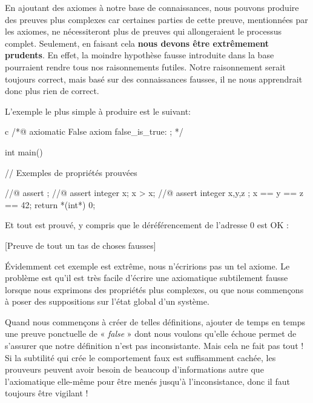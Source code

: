 

En ajoutant des axiomes à notre base de connaissances, nous pouvons produire des
preuves plus complexes car certaines parties de cette preuve, mentionnées par 
les axiomes, ne nécessiteront plus de preuves qui allongeraient le processus 
complet. Seulement, en faisant cela \textbf{nous devons être extrêmement prudents}.
En effet, la moindre hypothèse fausse introduite dans la base pourraient rendre
tous nos raisonnements futiles. Notre raisonnement serait toujours correct, mais
basé sur des connaissances fausses, il ne nous apprendrait donc plus rien de correct.



L'exemple le plus simple à produire est le suivant:



\begin{CodeBlock}{c}
/*@
  axiomatic False{
    axiom false_is_true: \false;
  }
*/

int main(){
  // Exemples de propriétés prouvées

  //@ assert \false;
  //@ assert \forall integer x; x > x;
  //@ assert \forall integer x,y,z ; x == y == z == 42;
  return *(int*) 0;
}
\end{CodeBlock}



Et tout est prouvé, y compris que le déréférencement de l'adresse 0 est OK :



[Preuve de tout un tas de choses fausses]


Évidemment cet exemple est extrême, nous n'écririons pas un tel axiome. Le
problème est qu'il est très facile d'écrire une axiomatique subtilement fausse
lorsque nous exprimons des propriétés plus complexes, ou que nous commençons à
poser des suppositions sur l'état global d'un système.



Quand nous commençons à créer de telles définitions, ajouter de temps en 
temps une preuve ponctuelle de « \textit{false} » dont nous voulons qu'elle échoue permet 
de s'assurer que notre définition n'est pas inconsistante. Mais cela ne fait pas 
tout ! Si la subtilité qui crée le comportement faux est suffisamment cachée, les
prouveurs peuvent avoir besoin de beaucoup d'informations autre que l'axiomatique
elle-même pour être menés jusqu'à l'inconsistance, donc il faut toujours être 
vigilant !



